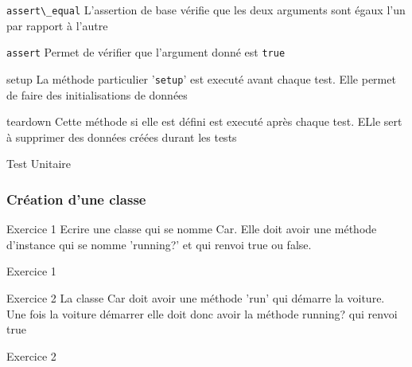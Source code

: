 \documentclass{beamer}
\begin{document}
\begin{frame}
  \begin{block}{\verb?assert\_equal?}
    L'assertion de base v\'erifie que les deux arguments sont \'egaux l'un par rapport à l'autre
  \end{block}
  \begin{block}{\verb?assert?}
    Permet de v\'erifier que l'argument donn\'e est \verb?true?
  \end{block}
  \begin{block}{setup}
    La m\'ethode particulier '\verb?setup?' est execut\'e avant chaque test. Elle permet de faire des initialisations de donn\'ees
  \end{block}
  \begin{block}{teardown}
    Cette m\'ethode si elle est d\'efini est execut\'e après chaque test. ELle sert à supprimer des donn\'ees cr\'e\'ees durant les tests
  \end{block}
\end{frame}

\begin{frame}
  \begin{beamerboxesrounded}{Test Unitaire}
    
  \end{beamerboxesrounded}
\end{frame}

\begin{frame}
  \frametitle{Cr\'eation d'une classe}
  \begin{block}{Exercice 1}
  Ecrire une classe qui se nomme Car. Elle doit avoir une m\'ethode d'instance qui
  se nomme 'running?' et qui renvoi true ou false.
\end{block}
\end{frame}

\begin{frame}
  \begin{block}{Exercice 1}
    
  \end{block}
\end{frame}

\begin{frame}
  \begin{block}{Exercice 2}
  La classe Car doit avoir une m\'ethode 'run' qui d\'emarre la voiture.
  Une fois la voiture d\'emarrer elle doit donc avoir la m\'ethode running? qui
  renvoi true
\end{block}
\end{frame}
\begin{frame}
  \begin{beamerboxesrounded}{Exercice 2}
    
  \end{beamerboxesrounded}
\end{frame}
\end{document}
